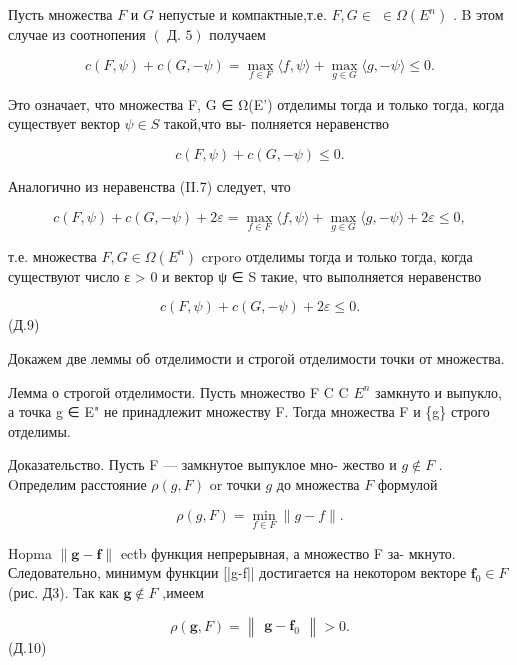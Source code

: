 \documentclass[8pt]{extarticle}
\begin{document}
Пусть множества \(F\) и \(G\) непустые и компактные,т.е. \(F,G \in \; \in  \Omega \left( {E}^{n}\right)\) . B этом случае из соотнопения \(\left( {\text{ Д. }5}\right)\) получаем

\[
c\left( {F,\psi }\right)  + c\left( {G, - \psi }\right)  = \mathop{\max }\limits_{{f \in  F}}\langle f,\psi \rangle  + \mathop{\max }\limits_{{g \in  G}}\langle g, - \psi \rangle  \leq  0.
\]

Это означает, что множества F, G ∈ Ω(E') отделимы тогда и только тогда, когда существует вектор \(\psi  \in  S\) такой,что вы- полняется неравенство

\[
c\left( {F,\psi }\right)  + c\left( {G, - \psi }\right)  \leq  0. \tag{II.8}
\]

Аналогично из неравенства (II.7) следует, что

\[
c\left( {F,\psi }\right)  + c\left( {G, - \psi }\right)  + {2\varepsilon } = \mathop{\max }\limits_{{f \in  F}}\langle f,\psi \rangle  + \mathop{\max }\limits_{{g \in  G}}\langle g, - \psi \rangle  + {2\varepsilon } \leq  0,
\]

т.е. множества \(F,G \in  \Omega \left( {E}^{n}\right)\) crporo отделимы тогда и только тогда, когда существуют число ε > 0 и вектор ψ ∈ S такие, что выполняется неравенство

\[
c\left( {F,\psi }\right)  + c\left( {G, - \psi }\right)  + {2\varepsilon } \leq  0.
\]
 (Д.9)

Докажем две леммы об отделимости и строгой отделимости точки от множества.

Лемма о строгой отделимости. Пусть множество F C C \({E}^{n}\) замкнуто и выпукло, а точка g ∈ E" не принадлежит множеству F. Тогда множества F и \{g\} строго отделимы.

Доказательство. Пусть F — замкнутое выпуклое мно- жество и \(g \notin  F\) . Oпределим расстояние \(\rho \left( {g,F}\right)\) or точки \(g\) до множества \(F\) формулой

\[
\rho \left( {g,F}\right)  = \mathop{\min }\limits_{{f \in  F}}\parallel g - f\parallel .
\]

Hopma \(\parallel \mathbf{g} - \mathbf{f}\parallel\) ectb функция непрерывная, а множество F за- мкнуто. Следовательно, минимум функции [|g-f|| достигается на некотором векторе \({\mathbf{f}}_{0} \in  F\) (рис. Д3). Так как \(\mathbf{g} \notin  F\) ,имеем

\[
\rho \left( {\mathbf{g},F}\right)  = \left\lVert \begin{array}{c} {\mathbf{g} - {\mathbf{f}}_{0}} \end{array} \right\rVert > 0.
\]
 (Д.10)
\end{document}

